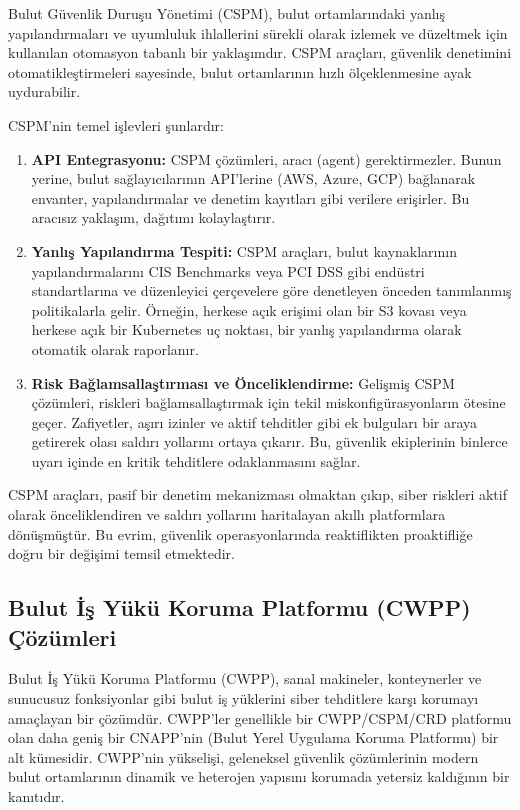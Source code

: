 Bulut Güvenlik Duruşu Yönetimi (CSPM), bulut ortamlarındaki yanlış yapılandırmaları ve uyumluluk ihlallerini sürekli olarak izlemek ve düzeltmek için kullanılan otomasyon tabanlı bir yaklaşımdır. CSPM araçları, güvenlik denetimini otomatikleştirmeleri sayesinde, bulut ortamlarının hızlı ölçeklenmesine ayak uydurabilir.

CSPM'nin temel işlevleri şunlardır:

\begin{enumerate}
    \item \textbf{API Entegrasyonu:} CSPM çözümleri, aracı (agent) gerektirmezler. Bunun yerine, bulut sağlayıcılarının API'lerine (AWS, Azure, GCP) bağlanarak envanter, yapılandırmalar ve denetim kayıtları gibi verilere erişirler. Bu aracısız yaklaşım, dağıtımı kolaylaştırır.
    \item \textbf{Yanlış Yapılandırma Tespiti:} CSPM araçları, bulut kaynaklarının yapılandırmalarını CIS Benchmarks veya PCI DSS gibi endüstri standartlarına ve düzenleyici çerçevelere göre denetleyen önceden tanımlanmış politikalarla gelir. Örneğin, herkese açık erişimi olan bir S3 kovası veya herkese açık bir Kubernetes uç noktası, bir yanlış yapılandırma olarak otomatik olarak raporlanır.
    \item \textbf{Risk Bağlamsallaştırması ve Önceliklendirme:} Gelişmiş CSPM çözümleri, riskleri bağlamsallaştırmak için tekil miskonfigürasyonların ötesine geçer. Zafiyetler, aşırı izinler ve aktif tehditler gibi ek bulguları bir araya getirerek olası saldırı yollarını ortaya çıkarır. Bu, güvenlik ekiplerinin binlerce uyarı içinde en kritik tehditlere odaklanmasını sağlar.
\end{enumerate}

CSPM araçları, pasif bir denetim mekanizması olmaktan çıkıp, siber riskleri aktif olarak önceliklendiren ve saldırı yollarını haritalayan akıllı platformlara dönüşmüştür. Bu evrim, güvenlik operasyonlarında reaktiflikten proaktifliğe doğru bir değişimi temsil etmektedir.

\subsection{Bulut İş Yükü Koruma Platformu (CWPP) Çözümleri}

Bulut İş Yükü Koruma Platformu (CWPP), sanal makineler, konteynerler ve sunucusuz fonksiyonlar gibi bulut iş yüklerini siber tehditlere karşı korumayı amaçlayan bir çözümdür. CWPP'ler genellikle bir CWPP/CSPM/CRD platformu olan daha geniş bir CNAPP'nin (Bulut Yerel Uygulama Koruma Platformu) bir alt kümesidir. CWPP'nin yükselişi, geleneksel güvenlik çözümlerinin modern bulut ortamlarının dinamik ve heterojen yapısını korumada yetersiz kaldığının bir kanıtıdır.

